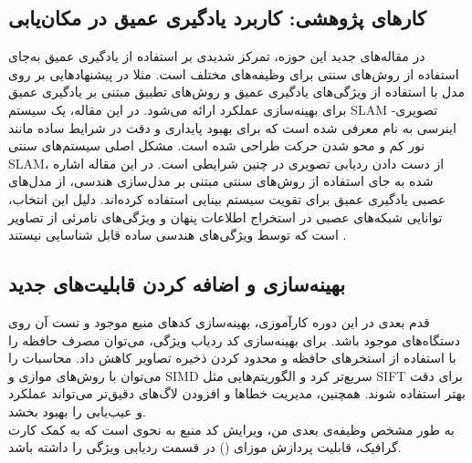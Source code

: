 \documentclass[11pt, a4paper]{article}
\begin{document}
	\subsection{کارهای پژوهشی: کاربرد یادگیری عمیق در  مکان‌یابی}
	در مقاله‌های جدید این حوزه، تمرکز شدیدی بر استفاده از یادگیری عمیق به‌جای استفاده از روش‌های سنتی برای 
	وظیفه‌های مختلف است.
	مثلا در
	\cite{luo2024supervinsrealtimevisualinertialslam}
	پیشنهادهایی بر روی مدل
	با استفاده از ویژگی‌های یادگیری عمیق و روش‌های تطبیق مبتنی بر یادگیری عمیق  برای بهینه‌سازی عملکرد   ارائه می‌شود.  در این مقاله، یک سیستم 
	\gls{SLAM} تصویری-اینرسی  به نام  معرفی شده است که برای بهبود پایداری و دقت
	در شرایط ساده مانند نور کم و محو شدن حرکت طراحی شده است. مشکل اصلی سیستم‌های سنتی 
	\gls{SLAM}، از دست دادن ردیابی تصویری در چنین شرایطی است.
	در این مقاله اشاره شده به جای استفاده از روش‌های سنتی مبتنی بر مدل‌سازی هندسی، از مدل‌های عصبی یادگیری عمیق برای تقویت سیستم بینایی استفاده کرده‌اند. دلیل این انتخاب، توانایی شبکه‌های عصبی در استخراج اطلاعات پنهان و ویژگی‌های نامرئی از تصاویر است که توسط ویژگی‌های هندسی ساده قابل شناسایی نیستند \cite{luo2024supervinsrealtimevisualinertialslam}.
	\subsection{بهینه‌سازی و اضافه کردن قابلیت‌های جدید}
	قدم بعدی در این دوره کارآموزی، بهینه‌سازی کدهای منبع موجود و تست آن روی دستگاه‌های موجود باشد. برای بهینه‌سازی کد ردیاب ویژگی، می‌توان مصرف حافظه را با استفاده از استخرهای حافظه و محدود کردن ذخیره تصاویر کاهش داد. محاسبات را می‌توان با روش‌های موازی و SIMD سریع‌تر کرد و الگوریتم‌هایی مثل SIFT برای دقت بهتر استفاده شوند. همچنین، مدیریت خطاها و افزودن لاگ‌های دقیق‌تر می‌تواند عملکرد و عیب‌یابی را بهبود بخشد.\\
	به طور مشخص وظیفه‌ی بعدی من، ویرایش کد منبع
	 به نحوی است که به کمک کارت گرافیک، قابلیت پردازش موزای
	()
	در قسمت ردیابی ویژگی را داشته باشد.
	
	
	
	
	
	\pagebreak
	\glsaddall
	\printglossary[type=\acronymtype, title=فهرست اختصارات]
	
	\pagebreak
	\setLTRbibitems
\end{document}
